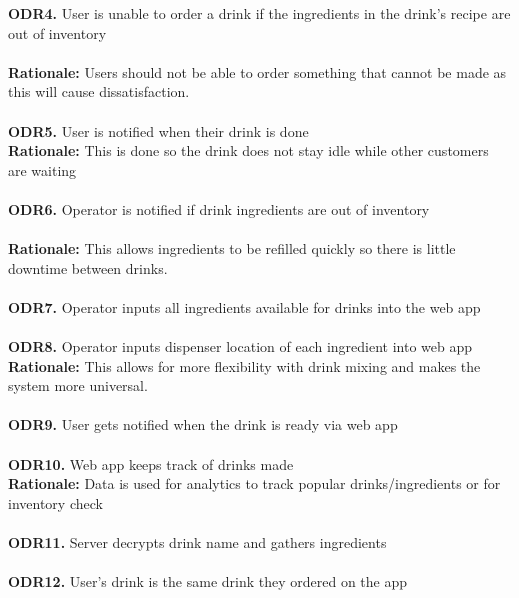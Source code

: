 \documentclass{article}
\begin{document}
    \textbf{ODR4.} User is unable to order a drink if the ingredients in the drink's recipe are out of inventory\\\\
    \textbf{Rationale:} Users should not be able to order something that cannot be made as this will cause dissatisfaction.\\\\
    
    \textbf{ODR5.} User is notified when their drink is done\\
    \textbf{Rationale:} This is done so the drink does not stay idle while other customers are waiting\\\\
    
    \textbf{ODR6.} Operator is notified if drink ingredients are out of inventory\\\\
    \textbf{Rationale:} This allows ingredients to be refilled quickly so there is little downtime between drinks.\\\\
    
    \textbf{ODR7.} Operator inputs all ingredients available for drinks into the web app\\\\
    
    \textbf{ODR8.} Operator inputs dispenser location of each ingredient into web app\\   
    \textbf{Rationale:} This allows for more flexibility with drink mixing and makes the system more universal.\\\\
    
    \textbf{ODR9.} User gets notified when the drink is ready via web app\\\\
    
    \textbf{ODR10.} Web app keeps track of drinks made\\
    \textbf{Rationale:} Data is used for analytics to track popular drinks/ingredients or for inventory check\\\\
    
    \textbf{ODR11.} Server decrypts drink name and gathers ingredients\\\\
    
    \textbf{ODR12.} User's drink is the same drink they ordered on the app \\\\
    
\end{document}
